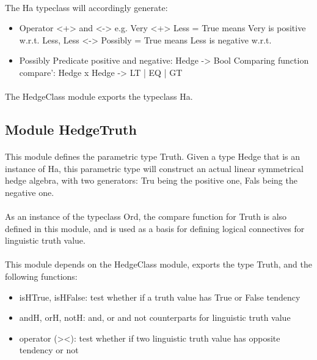 \documentclass[26pt,fleqn,]{article}
\begin{document}
\paragraph{}The Ha typeclass will accordingly generate:

\begin{itemize}
\item Operator <+> and <-> e.g. Very <+> Less = True means Very is
  positive w.r.t. Less, Less <-> Possibly = True means Less is
  negative w.r.t. 
\item Possibly Predicate positive and negative: Hedge ->
  Bool Comparing function compare': Hedge x Hedge -> LT | EQ | GT
\end{itemize}

\paragraph{}The HedgeClass module exports the typeclass Ha.

\subsection{Module HedgeTruth}


\paragraph{}This module defines the parametric type Truth. Given a type Hedge that is an instance of Ha, this parametric type will construct an actual linear symmetrical hedge algebra, with two generators: Tru being the positive one, Fals being the negative one. \\

\paragraph{}As an instance of the typeclass Ord, the compare function for Truth is also defined in this module, and is used as a basis for defining logical connectives for linguistic truth value.\\

\paragraph{}This module depends on the HedgeClass module, exports the type Truth, and the following functions:

\begin{itemize}
\item isHTrue, isHFalse: test whether if a truth value has True or
  False tendency 
\item andH, orH, notH: and, or and not counterparts for
  linguistic truth value 
\item operator (><): test whether if two linguistic
  truth value has opposite tendency or not
\end{itemize}
\end{document}
